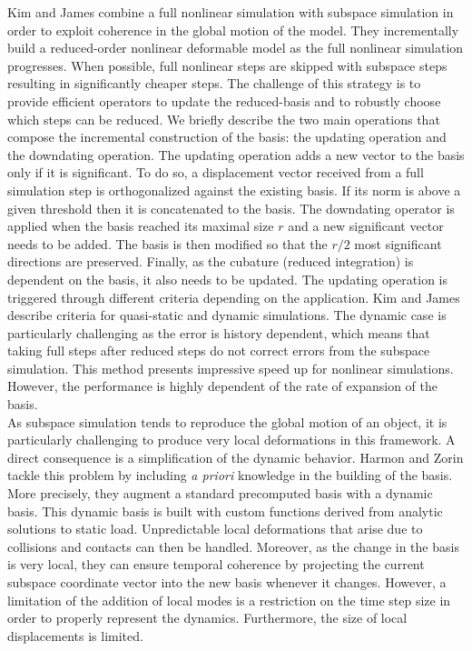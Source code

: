 Kim and James \cite{Kim2009Skipping} combine a full nonlinear simulation with subspace simulation in order to exploit coherence in the global motion of the model.
They incrementally build a reduced-order nonlinear deformable model as the full nonlinear simulation progresses. When possible, full nonlinear steps are skipped with subspace steps resulting in significantly cheaper steps. The challenge of this strategy is to provide efficient operators to update the reduced-basis and to robustly choose which steps can be reduced. We briefly describe the two main operations that compose the incremental construction of the basis: the updating operation and the downdating operation. The updating operation adds a new vector to the basis only if it is significant. To do so, a displacement vector received from a full simulation step is orthogonalized against the existing basis. If its norm is above a given threshold then it is concatenated to the basis. The downdating operator is applied when the basis reached its maximal size $r$ and a new significant vector needs to be added. The basis is then modified so that the $r/2$ most significant directions are preserved. Finally, as the cubature (reduced integration) is dependent on the basis, it also needs to be updated. The updating operation is triggered through different criteria depending on the application. Kim and James describe criteria for quasi-static and dynamic simulations. The dynamic case is particularly challenging as the error is history dependent, which means that taking full steps after reduced steps do not correct errors from the subspace simulation. This method presents impressive speed up for nonlinear simulations. However, the performance is highly dependent of the rate of expansion of the basis.
\\
As subspace simulation tends to reproduce the global motion of an object, it is particularly challenging to produce very local deformations in this framework. A direct consequence is a simplification of the dynamic behavior. Harmon and Zorin \cite{Harmon2013} tackle this problem by including \textit{a priori} knowledge in the building of the basis. More precisely, they augment a standard precomputed basis with a dynamic basis. This dynamic basis is built with custom functions derived from analytic solutions to static load. Unpredictable local deformations that arise due to collisions and contacts can then be handled. Moreover, as the change in the basis is very local, they can ensure temporal coherence by projecting the current subspace coordinate vector into the new basis whenever it changes. However, a limitation of the addition of local modes is a restriction on the time step size in order to properly represent the dynamics. Furthermore, the size of local displacements is limited.
